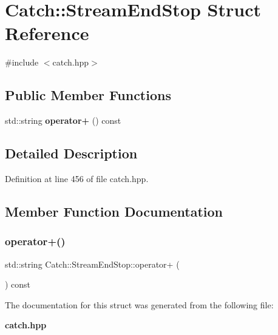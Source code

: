 \section{Catch\+::Stream\+End\+Stop Struct Reference}
\label{struct_catch_1_1_stream_end_stop}


{\ttfamily \#include $<$catch.\+hpp$>$}

\subsection*{Public Member Functions}
\begin{DoxyCompactItemize}
\item 
std\+::string \textbf{ operator+} () const
\end{DoxyCompactItemize}


\subsection{Detailed Description}


Definition at line 456 of file catch.\+hpp.



\subsection{Member Function Documentation}
\mbox{\label{struct_catch_1_1_stream_end_stop_a4a518f0342a381074821d5bda2651401}} 
\subsubsection{operator+()}
{\footnotesize\ttfamily std\+::string Catch\+::\+Stream\+End\+Stop\+::operator+ (\begin{DoxyParamCaption}{ }\end{DoxyParamCaption}) const}



The documentation for this struct was generated from the following file\+:\begin{DoxyCompactItemize}
\item 
\textbf{ catch.\+hpp}\end{DoxyCompactItemize}
